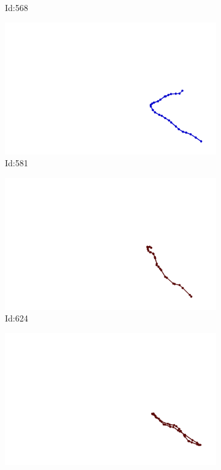 \documentclass[12pt,twoside]{report}
\begin{document}
\begin{figure}
\begin{subfigure}[b]{0.20\textwidth}
\caption{Id:568}
\end{subfigure}
\begin{subfigure}[b]{0.20\textwidth}
\centering
\includegraphics[width=\textwidth]{../trajectories/581.png}
\caption{Id:581}
\end{subfigure}
\begin{subfigure}[b]{0.20\textwidth}
\centering
\includegraphics[width=\textwidth]{../trajectories/624.png}
\caption{Id:624}
\end{subfigure}
\begin{subfigure}[b]{0.20\textwidth}
\centering
\includegraphics[width=\textwidth]{../trajectories/645.png}

\end{subfigure}
\end{figure}
\end{document}
